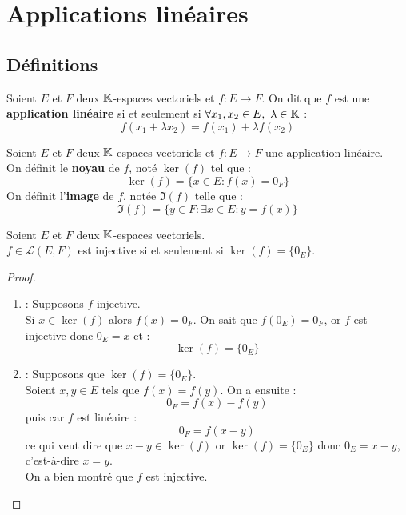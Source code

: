 \chapter{Applications linéaires}
\def\arraystretch{1}

\section{Définitions}
\begin{definition}
    Soient $E$ et $F$ deux $\mathbb{K}$-espaces vectoriels et $f : E \longrightarrow F$.
    On dit que $f$ est une \textbf{application linéaire} si et seulement si $\forall x_1, x_2 \in E,\ \lambda \in \mathbb{K}$ :
    \[ f(x_1 + \lambda x_2) = f(x_1) + \lambda f(x_2) \]
\end{definition}

\begin{definition}
    Soient $E$ et $F$ deux $\mathbb{K}$-espaces vectoriels et $f : E \longrightarrow F$ une application linéaire.
    \\
    On définit le \textbf{noyau} de $f$, noté $\ker(f)$ tel que :
    \[ \ker(f) = \{ x \in E : f(x) = 0_F \} \] 
    On définit l'\textbf{image} de $f$, notée $\Im(f)$ telle que :
    \[ \Im(f) = \{ y \in F : \exists x \in E : y = f(x) \} \]
\end{definition}

\begin{theorem}
	Soient $E$ et $F$ deux $\mathbb{K}$-espaces vectoriels. \\
	$f \in \mathcal{L}(E, F)$ est injective si et seulement si $\ker(f) = \{ 0_E \}$.
\end{theorem}

\begin{proof}
	\leavevmode
	\begin{enumerate}
		\item \boxed{\implies} : Supposons $f$ injective.
		\\
		Si $x \in \ker(f)$ alors $f(x) = 0_F$. On sait que $f(0_E) = 0_F$, or $f$ est injective donc $0_E = x$ et :
		\[ \ker(f) = \{ 0_E \} \]
		\item \boxed{\impliedby} : Supposons que $\ker(f) = \{ 0_E \}$.
		\\
		Soient $x, y \in E$ tels que $f(x) = f(y)$.
		On a ensuite :
		\[ 0_F = f(x) - f(y) \]
		puis car $f$ est linéaire :
		\[ 0_F = f(x - y) \]
		ce qui veut dire que $x - y \in \ker(f)$ or $\ker(f) = \{ 0_E \}$ donc $0_E = x - y$, c'est-à-dire $x = y$.
		\\
		On a bien montré que $f$ est injective.
	\end{enumerate}
\end{proof}

